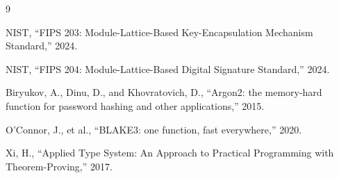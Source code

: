 \documentclass[11pt,a4paper]{article}
\begin{document}

\begin{thebibliography}{9}

NIST, ``FIPS 203: Module-Lattice-Based Key-Encapsulation Mechanism Standard,'' 2024.

NIST, ``FIPS 204: Module-Lattice-Based Digital Signature Standard,'' 2024.

Biryukov, A., Dinu, D., and Khovratovich, D., ``Argon2: the memory-hard function for password hashing and other applications,'' 2015.

O'Connor, J., et al., ``BLAKE3: one function, fast everywhere,'' 2020.

Xi, H., ``Applied Type System: An Approach to Practical Programming with Theorem-Proving,'' 2017.

\end{thebibliography}
\end{document}
